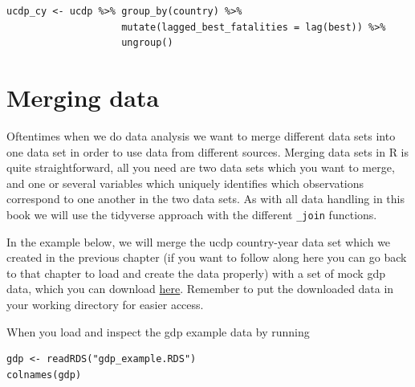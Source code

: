 \documentclass[
]{book}
\begin{document}
\begin{verbatim}
ucdp_cy <- ucdp %>% group_by(country) %>% 
                    mutate(lagged_best_fatalities = lag(best)) %>%
                    ungroup()
\end{verbatim}

\hypertarget{merging-data}{%
\chapter{Merging data}\label{merging-data}}

Oftentimes when we do data analysis we want to merge different data sets into one data set in order to use data from different sources. Merging data sets in R is quite straightforward, all you need are two data sets which you want to merge, and one or several variables which uniquely identifies which observations correspond to one another in the two data sets. As with all data handling in this book we will use the tidyverse approach with the different \texttt{\_join} functions.

In the example below, we will merge the ucdp country-year data set which we created in the previous chapter (if you want to follow along here you can go back to that chapter to load and create the data properly) with a set of mock gdp data, which you can download \href{https://github.com/Doktorandahl/teaching_data/raw/main/gdp_example.RDS}{here}. Remember to put the downloaded data in your working directory for easier access.

When you load and inspect the gdp example data by running

\begin{verbatim}
gdp <- readRDS("gdp_example.RDS")
colnames(gdp)
\end{verbatim}
\end{document}
